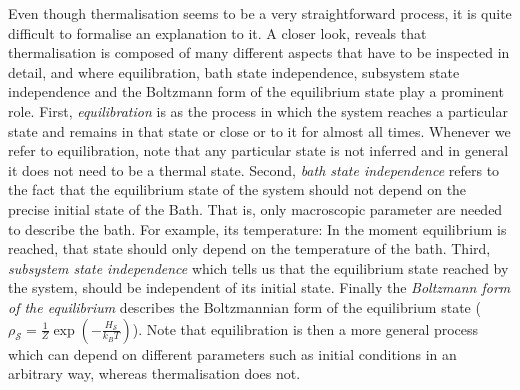 \indent Even though thermalisation seems to be a very straightforward process, it is quite difficult to formalise an explanation to it. A closer look, reveals that thermalisation is composed of many different aspects that have to be inspected in detail, and where equilibration, bath state independence, subsystem state independence and the Boltzmann form of the equilibrium state play a prominent role\cite{linden_quantum_2009}. First, \textit{equilibration} is  as the process in which the system reaches a particular state and remains in that state or close or to it for almost all times. Whenever we refer to equilibration, note that any particular state is not inferred and in general it does not need to be a thermal state. Second, \textit{bath state independence} refers to the fact that the equilibrium state of the system should not depend on the precise initial state of the Bath. That is, only macroscopic parameter are needed to describe the bath\cite{linden_quantum_2009}. For example, its temperature: In the moment equilibrium is reached, that state should only depend on the temperature of the bath. Third, \textit{subsystem state independence} which tells us that the equilibrium state reached by the system, should be independent of its initial state. Finally the \textit{Boltzmann form of the equilibrium} describes the Boltzmannian form of the equilibrium state ($\rho_{\mathcal{S}}=\frac{1}{Z}\operatorname{exp}(-\frac{H_{\mathcal{S}}}{k_B T})$). Note that equilibration is then a more general process which can depend on different parameters such as initial conditions in an arbitrary way, whereas thermalisation does not.\\

